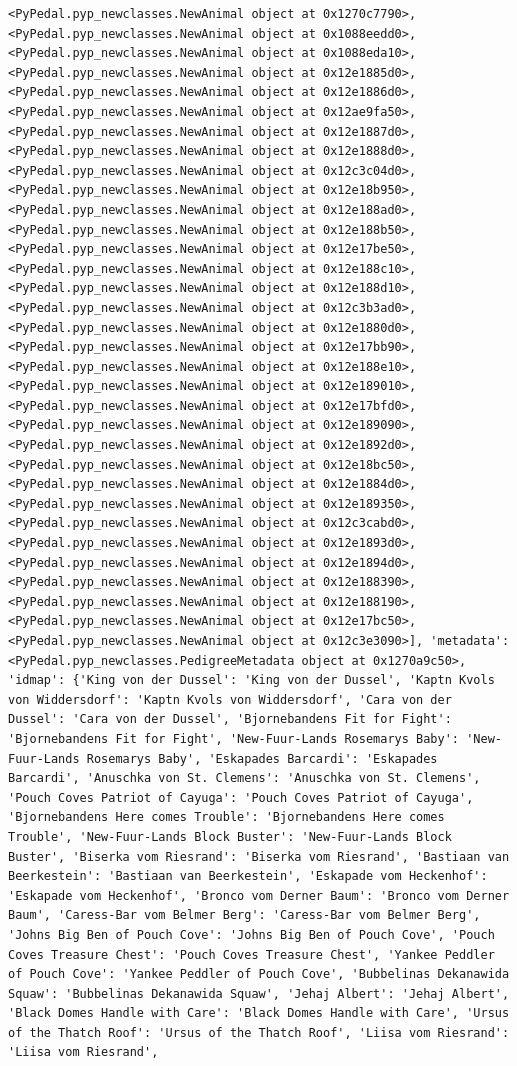 \documentclass[
  letterpaper,
  DIV=11,
  numbers=noendperiod]{scrreprt}
\begin{document}
\begin{codelisting}
{\begin{verbatim}
<PyPedal.pyp_newclasses.NewAnimal object at 0x1270c7790>, <PyPedal.pyp_newclasses.NewAnimal object at 0x1088eedd0>, <PyPedal.pyp_newclasses.NewAnimal object at 0x1088eda10>, <PyPedal.pyp_newclasses.NewAnimal object at 0x12e1885d0>, <PyPedal.pyp_newclasses.NewAnimal object at 0x12e1886d0>, <PyPedal.pyp_newclasses.NewAnimal object at 0x12ae9fa50>, <PyPedal.pyp_newclasses.NewAnimal object at 0x12e1887d0>, <PyPedal.pyp_newclasses.NewAnimal object at 0x12e1888d0>, <PyPedal.pyp_newclasses.NewAnimal object at 0x12c3c04d0>, <PyPedal.pyp_newclasses.NewAnimal object at 0x12e18b950>, <PyPedal.pyp_newclasses.NewAnimal object at 0x12e188ad0>, <PyPedal.pyp_newclasses.NewAnimal object at 0x12e188b50>, <PyPedal.pyp_newclasses.NewAnimal object at 0x12e17be50>, <PyPedal.pyp_newclasses.NewAnimal object at 0x12e188c10>, <PyPedal.pyp_newclasses.NewAnimal object at 0x12e188d10>, <PyPedal.pyp_newclasses.NewAnimal object at 0x12c3b3ad0>, <PyPedal.pyp_newclasses.NewAnimal object at 0x12e1880d0>, <PyPedal.pyp_newclasses.NewAnimal object at 0x12e17bb90>, <PyPedal.pyp_newclasses.NewAnimal object at 0x12e188e10>, <PyPedal.pyp_newclasses.NewAnimal object at 0x12e189010>, <PyPedal.pyp_newclasses.NewAnimal object at 0x12e17bfd0>, <PyPedal.pyp_newclasses.NewAnimal object at 0x12e189090>, <PyPedal.pyp_newclasses.NewAnimal object at 0x12e1892d0>, <PyPedal.pyp_newclasses.NewAnimal object at 0x12e18bc50>, <PyPedal.pyp_newclasses.NewAnimal object at 0x12e1884d0>, <PyPedal.pyp_newclasses.NewAnimal object at 0x12e189350>, <PyPedal.pyp_newclasses.NewAnimal object at 0x12c3cabd0>, <PyPedal.pyp_newclasses.NewAnimal object at 0x12e1893d0>, <PyPedal.pyp_newclasses.NewAnimal object at 0x12e1894d0>, <PyPedal.pyp_newclasses.NewAnimal object at 0x12e188390>, <PyPedal.pyp_newclasses.NewAnimal object at 0x12e188190>, <PyPedal.pyp_newclasses.NewAnimal object at 0x12e17bc50>, <PyPedal.pyp_newclasses.NewAnimal object at 0x12c3e3090>], 'metadata': <PyPedal.pyp_newclasses.PedigreeMetadata object at 0x1270a9c50>, 'idmap': {'King von der Dussel': 'King von der Dussel', 'Kaptn Kvols von Widdersdorf': 'Kaptn Kvols von Widdersdorf', 'Cara von der Dussel': 'Cara von der Dussel', 'Bjornebandens Fit for Fight': 'Bjornebandens Fit for Fight', 'New-Fuur-Lands Rosemarys Baby': 'New-Fuur-Lands Rosemarys Baby', 'Eskapades Barcardi': 'Eskapades Barcardi', 'Anuschka von St. Clemens': 'Anuschka von St. Clemens', 'Pouch Coves Patriot of Cayuga': 'Pouch Coves Patriot of Cayuga', 'Bjornebandens Here comes Trouble': 'Bjornebandens Here comes Trouble', 'New-Fuur-Lands Block Buster': 'New-Fuur-Lands Block Buster', 'Biserka vom Riesrand': 'Biserka vom Riesrand', 'Bastiaan van Beerkestein': 'Bastiaan van Beerkestein', 'Eskapade vom Heckenhof': 'Eskapade vom Heckenhof', 'Bronco vom Derner Baum': 'Bronco vom Derner Baum', 'Caress-Bar vom Belmer Berg': 'Caress-Bar vom Belmer Berg', 'Johns Big Ben of Pouch Cove': 'Johns Big Ben of Pouch Cove', 'Pouch Coves Treasure Chest': 'Pouch Coves Treasure Chest', 'Yankee Peddler of Pouch Cove': 'Yankee Peddler of Pouch Cove', 'Bubbelinas Dekanawida Squaw': 'Bubbelinas Dekanawida Squaw', 'Jehaj Albert': 'Jehaj Albert', 'Black Domes Handle with Care': 'Black Domes Handle with Care', 'Ursus of the Thatch Roof': 'Ursus of the Thatch Roof', 'Liisa vom Riesrand': 'Liisa vom Riesrand', 
\end{verbatim}}
\end{codelisting}
\end{document}
